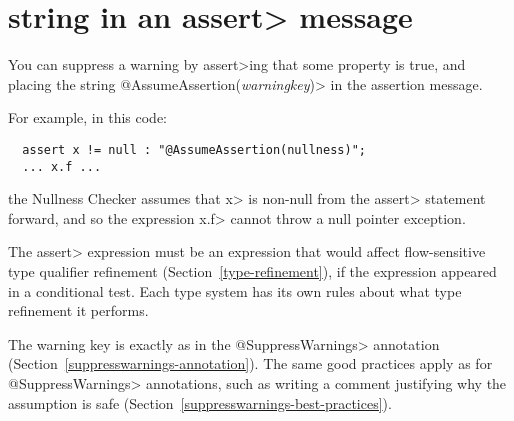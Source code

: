 \section{ string in an \<assert> message\label{assumeassertion}}

\begin{sloppypar}
You can suppress a warning by \<assert>ing that some property is true, and
placing the string \<@AssumeAssertion(\emph{warningkey})> in the assertion
message.
\end{sloppypar}

For example, in this code:

\begin{Verbatim}
  assert x != null : "@AssumeAssertion(nullness)";
  ... x.f ...
\end{Verbatim}

\noindent
the Nullness Checker assumes that \<x> is non-null from the \<assert>
statement forward, and so the expression \<x.f> cannot throw a null pointer
exception.

The \<assert> expression must be an expression that would affect flow-sensitive
type qualifier refinement (Section~\ref{type-refinement}), if the
expression appeared in a conditional test.  Each type system has its own
rules about what type refinement it performs.

The warning key is exactly as in the \<@SuppressWarnings> annotation
(Section~\ref{suppresswarnings-annotation}).  The same good practices apply
as for \<@SuppressWarnings> annotations, such as writing a comment
justifying why the assumption is safe
(Section~\ref{suppresswarnings-best-practices}).






